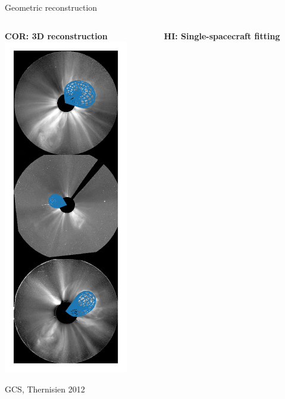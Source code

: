 \documentclass[10pt,aspectratio=169,usenames,dvipsnames]{beamer}
\begin{document}
\begin{frame}{Geometric reconstruction}
    \begin{columns}[t]
        \begin{column}{0.32\textwidth}
            \centering
            \textbf{COR: 3D reconstruction}\\[2mm]
            
            \includegraphics[height=0.8\textheight]{plots/gcs.pdf}
            
            {\footnotesize GCS, Thernisien 2012}
        \end{column}
        \begin{column}{0.32\textwidth}
            \centering
            \textbf{HI: Single-spacecraft fitting}\\[2mm]
            
\end{column}
\end{columns}
\end{frame}
\end{document}

